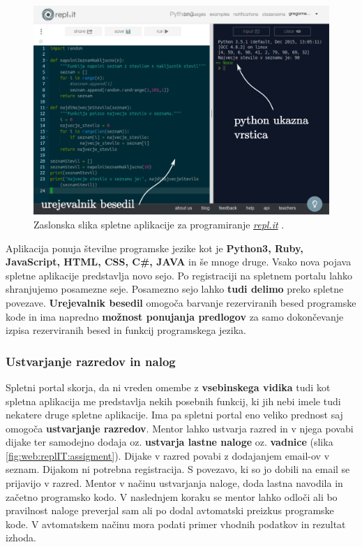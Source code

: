 \begin{figure}[h!]
  \centering
    \includegraphics [width=0.65\linewidth, keepaspectratio =
   1] {./images/sc_web/replIT_main-v01.png}
   \caption{Zaslonska slika spletne aplikacije za programiranje
     \emph{\href{https://repl.it/}{repl.it}} \cite{web:replIT}.}
    \label{fig:web:replIT}
\end{figure}

Aplikacija ponuja številne programske jezike kot je \textbf{Python3,
  Ruby, JavaScript, HTML, CSS, C\#, JAVA} in še mnoge druge. Vsako nova
pojava spletne aplikacije predstavlja novo sejo. Po registraciji na
spletnem portalu lahko shranjujemo posamezne seje. Posamezno sejo
lahko \textbf{tudi delimo} preko spletne povezave. \textbf{Urejevalnik
  besedil} omogoča barvanje rezerviranih besed programske kode in ima napredno
\textbf{možnost ponujanja predlogov} za samo dokončevanje izpisa
rezerviranih besed in funkcij programskega jezika.

\subsubsection{Ustvarjanje razredov in nalog}
\label{sec:ustvarjanje_raz_nalog}

Spletni portal skorja, da ni vreden omembe z \textbf{vsebinskega
  vidika} tudi kot spletna aplikacija me predstavlja nekih posebnih
funkcij, ki jih nebi imele tudi nekatere druge spletne aplikacije. Ima
pa spletni portal eno veliko prednost saj omogoča \textbf{ustvarjanje
  razredov}. Mentor lahko ustvarja razred in v njega povabi dijake ter
samodejno dodaja oz. \textbf{ustvarja lastne naloge}
oz. \textbf{vadnice} (slika \ref{fig:web:replIT:assigment}). Dijake v
razred povabi z dodajanjem email-ov v seznam. Dijakom ni potrebna
registracija. S povezavo, ki so jo dobili na email se prijavijo v
razred. Mentor v načinu ustvarjanja naloge, doda lastna navodila in
začetno programsko kodo. V naslednjem koraku se mentor lahko odloči
ali bo pravilnost naloge preverjal sam ali po dodal avtomatski
preizkus programske kode. V avtomatskem načinu mora podati primer
vhodnih podatkov in rezultat izhoda.

